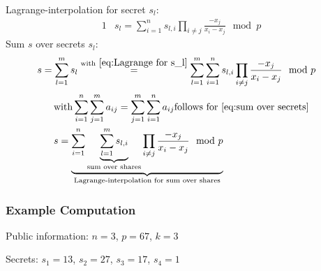 		Lagrange-interpolation for secret $s_l$:
		\begin{alignat}{1}
			&s_l = \sum_{i=1}^{n}s_{l,i}\prod_{i\neq j}\frac{-x_j}{x_i - x_j} \mod p \label{eq:Lagrange for s_l}
		\end{alignat}
		Sum $s$ over secrets $s_l$:
		\begin{alignat}{1}
			&s = \sum_{l=1}^{m} s_l \overset{\text{with} \ \ref{eq:Lagrange for s_l}}{=} \sum_{l=1}^{m} \sum_{i=1}^{n} s_{l,i}\prod_{i\neq j} \frac{-x_j}{x_i-x_j} \mod p \label{eq:sum over secrets}
		\end{alignat}
		\begin{alignat}{1}
		&\text{with} \sum_{i=1}^{n}\sum_{j=1}^{m}a_{ij} = \sum_{j=1}^{m}\sum_{i=1}^{n}a_{ij} \text{follows for \ref{eq:sum over secrets}} \nonumber\\
		&s= \underbrace{ \sum_{i=1}^n \underbrace{\sum_{l=1}^{m} s_{l,i}}_{\text{sum over shares}} \prod_{i\neq j} \frac{-x_j}{x_i-x_j} \mod p }_{\text{Lagrange-interpolation for sum over shares}}
		\end{alignat}	
		
		\subsubsection*{Example Computation}
		Public information: $n=3$, $p=67$, $k=3$\par
		
		\noindent Secrets: $s_1=13$, $s_2=27$, $s_3=17$, $s_4=1$\par
		
